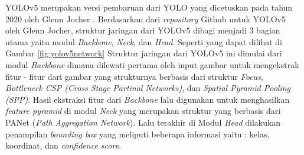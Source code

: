 \par YOLOv5 merupakan versi pembaruan dari YOLO yang dicetuskan pada tahun 2020 oleh Glenn Jocher \cite{glenn_jocher_yolov5}. Berdasarkan dari \emph{repository} Github untuk YOLOv5 oleh Glenn Jocher, struktur jaringan dari YOLOv5 dibagi menjadi 3 bagian utama yaitu modul \emph{Backbone}, \emph{Neck}, dan \emph{Head}.
Seperti yang dapat dilihat di Gambar \ref{fig:yolov5network} Struktur jaringan dari YOLOv5 ini dimulai dari modul \emph{Backbone} dimana dilewati pertama oleh input gambar untuk mengekstrak fitur - fitur dari gambar yang strukturnya berbasis dari struktur \emph{Focus}, \emph{Bottleneck CSP (Cross Stage Partinal Networks)}, dan \emph{Spatial Pyramid Pooling (SPP)}.
Hasil ekstraksi fitur dari \emph{Backbone} lalu digunakan untuk menghasilkan \emph{feature pyramid} di modul \emph{Neck} yang merupakan struktur yang berbasis dari PANet (\emph{Path Aggregation Network}).
Lalu terakhir di Modul \emph{Head} dilakukan penampilan \emph{bounding box} yang meliputi beberapa informasi yaitu : kelas, koordinat, dan \emph{confidence score}.
